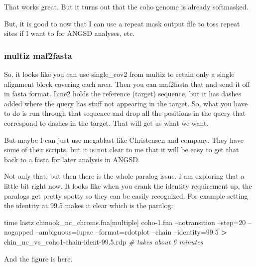 \documentclass[]{krantz}
\makeatletter
\newenvironment{Shaded}{\begin{snugshade}}{\end{snugshade}}
\newcommand{\BuiltInTok}[1]{#1}
\newcommand{\CommentTok}[1]{\textcolor[rgb]{0.37,0.37,0.37}{\textit{#1}}}
\newcommand{\NormalTok}[1]{#1}
\newcommand{\OperatorTok}[1]{\textcolor[rgb]{0.43,0.43,0.43}{\textbf{#1}}}
\newenvironment{kframe}{%
\medskip{}
\setlength{\fboxsep}{.8em}
 \def\at@end@of@kframe{}%
 \ifinner\ifhmode%
  \def\at@end@of@kframe{\end{minipage}}%
  \begin{minipage}{\columnwidth}%
 \fi\fi%
 \def\FrameCommand##1{\hskip\@totalleftmargin \hskip-\fboxsep
 \colorbox{shadecolor}{##1}\hskip-\fboxsep
     \hskip-\linewidth \hskip-\@totalleftmargin \hskip\columnwidth}%
 \MakeFramed {\advance\hsize-\width
   \@totalleftmargin\z@ \linewidth\hsize
   \@setminipage}}%
 {\par\unskip\endMakeFramed%
 \at@end@of@kframe}
\renewenvironment{Shaded}{\begin{kframe}}{\end{kframe}}
\makeatother
\begin{document}
That works great. But it turns out that the coho genome is already softmasked.

But, it is good to now that I can use a repeat mask output file to toss repeat
sites if I want to for ANGSD analyses, etc.

\hypertarget{multiz-maf2fasta}{%
\subsubsection{multiz maf2fasta}\label{multiz-maf2fasta}}

So, it looks like you can use single\_cov2 from multiz to retain only a single
alignment block covering each area. Then you can maf2fasta that and send it off in
fasta format. Line2 holds the reference (target) sequence, but it has dashes added where
the query has stuff not appearing in the target. So, what you have to do is run through that sequence and drop all the positions in the query that correspond to dashes in the
target. That will get us what we want.

But maybe I can just use megablast like Christensen and company. They have some of their
scripts, but it is not clear to me that it will be easy to get that back to a fasta
for later analysis in ANGSD.

Not only that, but then there is the whole paralog issue. I am exploring that a little
bit right now. It looks like when you crank the identity requirement up, the paralogs
get pretty spotty so they can be easily recognized. For example setting the identity
at 99.5 makes it clear which is the paralog:

\begin{Shaded}
\begin{Highlighting}[]
\BuiltInTok{time}\NormalTok{ lastz chinook_nc_chroms.fna[multiple]  coho-1.fna --notransition --step=20 --nogapped --ambiguous=iupac --format=rdotplot --chain --identity=99.5 }\OperatorTok{>}\NormalTok{ chin_nc_vs_coho1-chain-ident-99.5.rdp}
\CommentTok{# takes about 6 minutes}
\end{Highlighting}
\end{Shaded}

And the figure is here.
\end{document}
